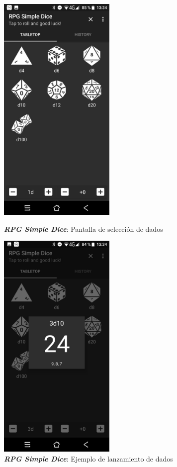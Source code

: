 \begin{figure}[H]
    \centering
    \begin{minipage}{0.35\textwidth}
        \centering
        \includegraphics[width=0.5\textwidth]{Images/RPG_Simple_Dice_1.jpeg}
        \caption{\textit{\textbf{RPG Simple Dice}}: Pantalla de selección 
        de dados}
        
    \end{minipage} \hspace{2cm}
    \begin{minipage}{0.35\textwidth}
        \centering
        \includegraphics[width=0.5\textwidth]{Images/RPG_Simple_Dice_2.jpeg}
        \caption{\textit{\textbf{RPG Simple Dice}}: Ejemplo de lanzamiento de 
        dados}
        
    \end{minipage}
\end{figure}
